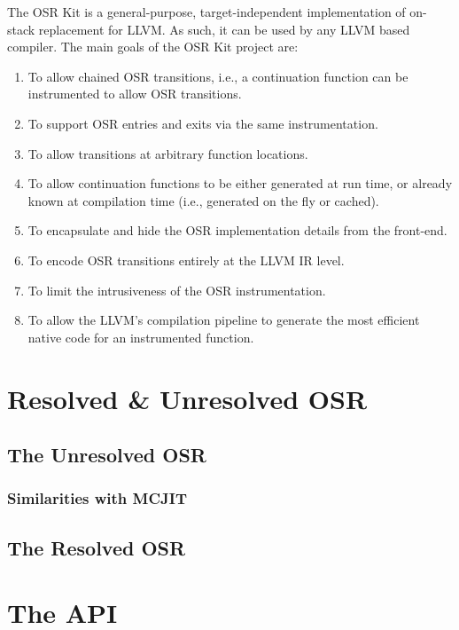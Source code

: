 The OSR Kit is a general-purpose, target-independent implementation of on-stack replacement for LLVM.
As such, it can be used by any LLVM based compiler.
The main goals of the OSR Kit project are:
\begin{enumerate}
    \item To allow chained OSR transitions, i.e., a continuation function can be instrumented to allow OSR transitions.
    \item To support OSR entries and exits via the same instrumentation.
    \item To allow transitions at arbitrary function locations.
    \item To allow continuation functions to be either generated at run time, or already known at compilation time (i.e., generated on the fly or cached).
    \item To encapsulate and hide the OSR implementation details from the front-end.
    \item To encode OSR transitions entirely at the LLVM IR level.
    \item To limit the intrusiveness of the OSR instrumentation.
    \item To allow the LLVM's compilation pipeline to generate the most efficient native code for an instrumented function.
\end{enumerate}



\section{Resolved \& Unresolved OSR}
\subsection{The Unresolved OSR}
\subsubsection{Similarities with MCJIT}
\subsection{The Resolved OSR}

\section{The API}
